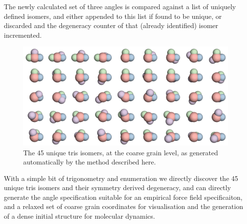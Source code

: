 \documentclass[journal=nanofd,manuscript=suppinfo]{achemso}
\begin{document}
The newly calculated set of three angles is compared against a list of uniquely
defined isomers, and either appended to this list if found to be unique, or
discarded and the degeneracy counter of that (already identified) isomer incremented.

\begin{figure}[ht!]
    \begin{center}
        \includegraphics[width=\textwidth]{tris_white_bg_pastel.png}
            \caption{\label{fig-trisCG}The 45 unique tris isomers, at the coarse grain level, as generated automatically by the method described here.}
    \end{center}
\end{figure}

With a simple bit of trigonometry and enumeration we directly discover the 45
unique tris isomers and their symmetry derived degeneracy, and can directly
generate the angle specification suitable for an empirical force field
specificaiton, and a relaxed set of coarse grain coordinates for visualisation
and the generation of a dense initial structure for molecular dynamics.
\end{document}
